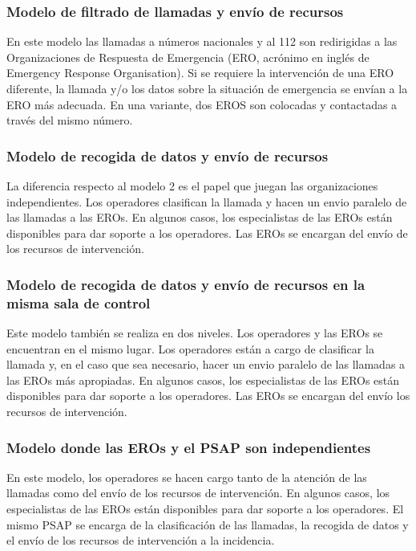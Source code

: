 \subsubsection{Modelo de filtrado de llamadas y envío de recursos}

En este modelo las llamadas a números nacionales y al 112 son redirigidas a las  Organizaciones de Respuesta de Emergencia (ERO, acrónimo en inglés de Emergency Response Organisation). Si se requiere la intervención de una ERO diferente, la llamada y/o los datos sobre la situación de emergencia se envían a la ERO más adecuada. En una variante, dos EROS son colocadas y contactadas a través del mismo número.

\subsubsection{Modelo de recogida de datos y envío de recursos}

La diferencia respecto al modelo 2 es el papel que juegan las organizaciones independientes. Los operadores clasifican la llamada y hacen un envio paralelo de las llamadas a las EROs. En algunos casos, los especialistas de las EROs están disponibles para dar soporte a los operadores. Las EROs se encargan del envío de los recursos de intervención.

\subsubsection{Modelo de recogida de datos y envío de recursos en la misma sala de control}

Este modelo también se realiza en dos niveles. Los operadores y las EROs se encuentran en el mismo lugar. Los operadores están a cargo de clasificar la llamada y, en el caso que sea necesario, hacer un envio paralelo de las llamadas a las EROs más apropiadas. En algunos casos, los especialistas de las EROs están disponibles para dar soporte a los operadores. Las EROs se encargan del envío los recursos de intervención.

\subsubsection{Modelo donde las EROs y el PSAP son independientes}

En este modelo, los operadores se hacen cargo tanto de la atención de las llamadas como del envío de los recursos de intervención. En algunos casos, los especialistas de las EROs están disponibles para dar soporte a los operadores. El mismo PSAP se encarga de la clasificación de las llamadas, la recogida de datos y el envío de los recursos de intervención a la incidencia.

